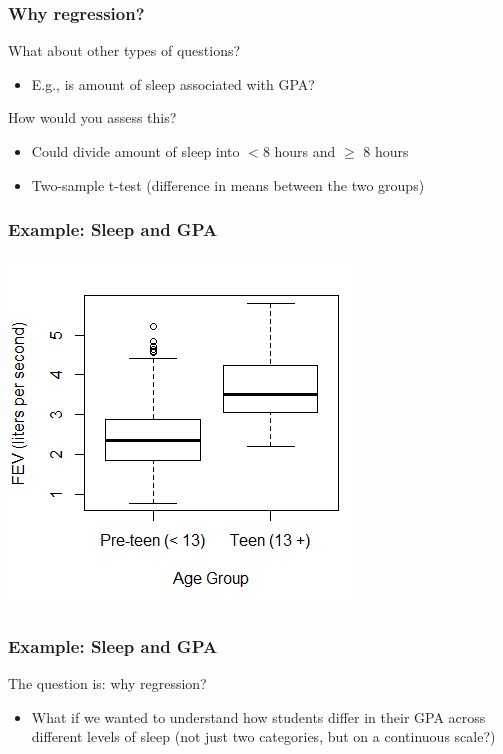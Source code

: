 \documentclass[12pt, 
hyperref={colorlinks=true, linkcolor=blue, urlcolor=cyan}]{beamer}
\begin{document}
\begin{frame}
\frametitle{Why regression?}
What about other types of questions?
\begin{itemize} %
\item E.g., is amount of sleep associated with GPA?
\end{itemize}
How would you assess this?
\begin{itemize} %
\item Could divide amount of sleep into $< 8$ hours and $\ge$ 8 hours
\item Two-sample t-test (difference in means between the two groups)
\end{itemize}
\end{frame}

\begin{frame}
\frametitle{Example: Sleep and GPA} %
\center \includegraphics[height=0.8\textheight]{./intro_boxplot} %
\end{frame}

\begin{frame}
\frametitle{Example: Sleep and GPA} %
The question is: why regression?
\begin{itemize}
\item What if we wanted to understand how students differ in their GPA across different levels of sleep (not just two categories, but on a continuous scale?)
\end{itemize}
\end{frame}
\end{document}
